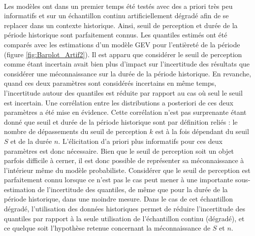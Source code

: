 	\paragraph{} Les modèles ont dans un premier temps été testés avec des a priori très peu informatifs et sur un échantillon continu artificiellement dégradé afin de se replacer dans un contexte historique. Ainsi, seuil de perception et durée de la période historique sont parfaitement connus. Les quantiles estimés ont été comparés avec les estimations d'un modèle GEV pour l'entièreté de la période (figure \ref{fig:Barplot_Artif2}). Il est apparu que considérer le seuil de perception comme étant incertain avait bien plus d'impact sur l'incertitude des résultats que considérer une méconnaissance sur la durée de la période historique. En revanche, quand ces deux paramètres sont considérés incertains en même temps, l'incertitude autour des quantiles est réduite par rapport au cas où seul le seuil est incertain. Une corrélation entre les distributions a posteriori de ces deux paramètres a été mise en évidence. Cette corrélation n'est pas surprenante étant donné que seuil et durée de la période historique sont par définition reliés : le nombre de dépassements du seuil de perception $k$ est à la fois dépendant du seuil $S$ et de la durée $n$. L'élicitation d'a priori plus informatifs pour ces deux paramètres est donc nécessaire. Bien que le seuil de perception soit un objet parfois difficile à cerner, il est donc possible de représenter sa méconnaissance à l'intérieur même du modèle probabiliste. Considérer que le seuil de perception est parfaitement connu lorsque ce n'est pas le cas peut mener à une importante sous-estimation de l'incertitude des quantiles, de même que pour la durée de la période historique, dans une moindre mesure. Dans le cas de cet échantillon dégradé, l'utilisation des données historiques permet de réduire l'incertitude des quantiles par rapport à la seule utilisation de l'échantillon continu (dégradé), et ce quelque soit l'hypothèse retenue concernant la méconnaissance de $S$ et $n$.
	
